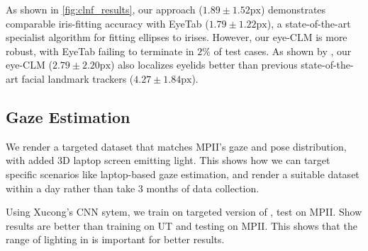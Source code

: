 As shown in \autoref{fig:clnf_results}, our approach ($1.89\!\pm\!1.52\textrm{px}$) demonstrates comparable iris-fitting accuracy with EyeTab ($1.79\!\pm\!1.22\textrm{px}$), a state-of-the-art specialist algorithm for fitting ellipses to irises. However, our eye-CLM is more robust, with EyeTab failing to terminate in $2\%$ of test cases. As shown by , our eye-CLM ($2.79\!\pm\!2.20\textrm{px}$) also localizes eyelids better than previous state-of-the-art facial landmark trackers ($4.27\!\pm\!1.84\textrm{px}$).



\subsection{Gaze Estimation}



We render a targeted dataset that matches MPII's gaze and pose distribution, with added 3D laptop screen emitting light. This shows how we can target specific scenarios like laptop-based gaze estimation, and render a suitable dataset within a day rather than take 3 months of data collection.

Using Xucong's CNN sytem, we train on targeted version of \dataset, test on MPII. Show results are better than training on UT and testing on MPII. This shows that the range of lighting in \dataset is important for better results.


